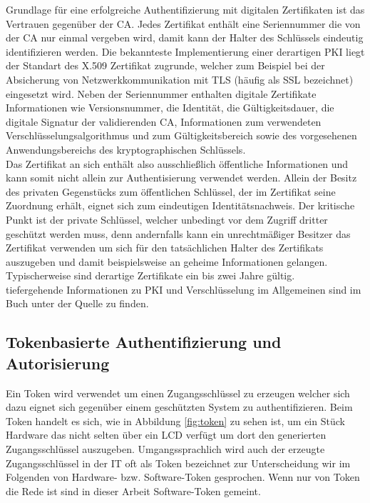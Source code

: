\documentclass[
book,
a4paper,   
titlepage,  
halfparskip,
12pt        
]{scrartcl}
\begin{document}
\begin{onehalfspacing}
Grundlage für eine erfolgreiche Authentifizierung mit digitalen Zertifikaten ist das Vertrauen gegenüber der \ac{CA}. Jedes Zertifikat enthält eine Seriennummer die von der \ac{CA} nur einmal vergeben wird, damit kann der Halter des Schlüssels eindeutig identifizieren werden. Die bekannteste Implementierung einer derartigen \ac{PKI} liegt der Standart des X.509 Zertifikat zugrunde, welcher zum Beispiel bei der Absicherung von Netzwerkkommunikation mit \ac{TLS} (häufig als \ac{SSL} bezeichnet) eingesetzt wird. Neben der Seriennummer enthalten digitale Zertifikate Informationen wie Versionsnummer, die Identität, die Gültigkeitsdauer, die digitale Signatur der validierenden \ac{CA}, Informationen zum verwendeten Verschlüsselungsalgorithmus und zum Gültigkeitsbereich sowie des vorgesehenen Anwendungsbereichs des kryptographischen Schlüssels.\cite[S. 144]{kerberos2}\\
Das Zertifikat an sich enthält also ausschließlich öffentliche Informationen und kann somit nicht allein zur Authentisierung verwendet werden. Allein der Besitz des privaten Gegenstücks zum öffentlichen Schlüssel, der im Zertifikat seine Zuordnung erhält, eignet sich zum eindeutigen Identitätsnachweis. Der kritische Punkt ist der private Schlüssel, welcher unbedingt vor dem Zugriff dritter geschützt werden muss, denn andernfalls kann ein unrechtmäßiger Besitzer das Zertifikat verwenden um sich für den tatsächlichen Halter des Zertifikats auszugeben und damit beispielsweise an geheime Informationen gelangen. Typischerweise sind derartige Zertifikate ein bis zwei Jahre gültig.\cite[S. 145f]{kerberos2}\\
tiefergehende Informationen zu \ac{PKI} und Verschlüsselung im Allgemeinen sind im Buch unter der Quelle \cite{crypto} zu finden.

\subsection{Tokenbasierte Authentifizierung und Autorisierung}
\label{subsec:token}
Ein Token wird verwendet um einen Zugangsschlüssel zu erzeugen welcher sich dazu eignet sich gegenüber einem geschützten System zu authentifizieren. Beim Token handelt es sich, wie in Abbildung \vref{fig:token} zu sehen ist, um ein Stück Hardware das nicht selten über ein \ac{LCD} verfügt um dort den generierten Zugangsschlüssel auszugeben. Umgangssprachlich wird auch der erzeugte Zugangsschlüssel in der \ac{IT} oft als Token bezeichnet zur Unterscheidung wir im Folgenden von Hardware- bzw. Software-Token gesprochen. Wenn nur von Token die Rede ist sind in dieser Arbeit Software-Token gemeint. \cite[S.141ff]{kerberos2}


\end{onehalfspacing}
\end{document}
